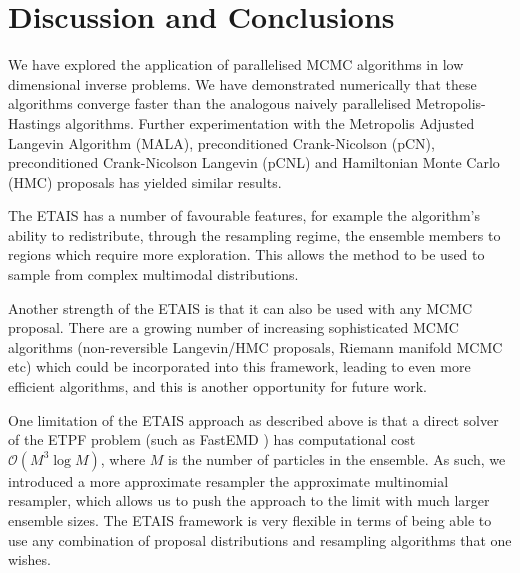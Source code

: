 \documentclass[final]{siamltex}
\begin{document}
\section{Discussion and Conclusions}\label{Sec:Conc} 

We have explored the application of parallelised MCMC algorithms in
low dimensional inverse problems. We have demonstrated numerically
that these algorithms converge faster than the analogous naively parallelised
Metropolis-Hastings algorithms. Further experimentation with the Metropolis
Adjusted Langevin Algorithm (MALA), preconditioned Crank-Nicolson (pCN),
preconditioned Crank-Nicolson Langevin (pCNL) and Hamiltonian
Monte Carlo (HMC) proposals has yielded similar results\cite{Paul}.

  

The ETAIS has a number of favourable features, for example the
algorithm's ability to redistribute, through the resampling regime,
the ensemble members to regions which require more exploration. This allows the
method to be used to sample from complex multimodal distributions.

Another strength of the ETAIS is that it can also be used with any MCMC
proposal. There are a growing number of increasing sophisticated MCMC
algorithms (non-reversible Langevin/HMC proposals, Riemann manifold MCMC etc) which could be
incorporated into this framework, leading to even more efficient
algorithms, and this is another opportunity for future work. 

One limitation of the ETAIS approach as described above is that a
direct solver of the ETPF problem (such as FastEMD \cite{FastEMD}) has computational cost
$\mathcal{O}(M^3\log M)$, where $M$ is the number of particles in the
ensemble. As such, we introduced a more approximate resampler the
approximate multinomial resampler, which allows us to push the
approach to the limit
with much larger ensemble sizes. The ETAIS framework is very flexible
in terms of being able to use any combination of proposal
distributions and resampling algorithms that one wishes.
\end{document}
